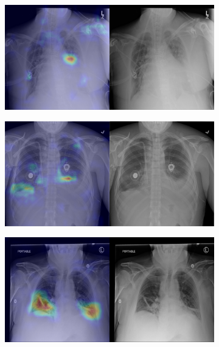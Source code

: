 \begin{figure}[b]
\begin{subfigure}{0.4\textwidth}
    \end{subfigure}
    \begin{subfigure}{0.4\textwidth}
        \centering
        \includegraphics[width=1.0\textwidth]{Chapters/5. Conclusiones/img/Atelectasis/1_1_00000032_036.png}
    \end{subfigure}
    \begin{subfigure}{0.4\textwidth}
        \centering
        \includegraphics[width=1.0\textwidth]{Chapters/5. Conclusiones/img/Atelectasis/1_1_00029596_022.png}
    \end{subfigure}
    \begin{subfigure}{0.4\textwidth}
        \centering
        \includegraphics[width=1.0\textwidth]{Chapters/5. Conclusiones/img/Atelectasis/1_1_00030408_000.png}

\end{subfigure}
\end{figure}
